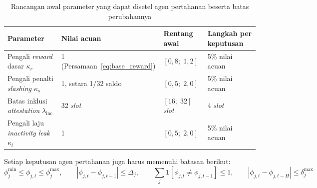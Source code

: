 \begin{table}[htbp]
\centering
\caption{Rancangan awal parameter yang dapat disetel agen pertahanan beserta batas perubahannya}
\label{tab:batas_parameter}
\small
\begin{tabular}{|p{3.8cm}|p{3.6cm}|p{2.6cm}|p{3.2cm}|}
\hline
\textbf{Parameter} & \textbf{Nilai acuan} & \textbf{Rentang awal} & \textbf{Langkah per keputusan} \\
\hline
Pengali \textit{reward} dasar $\kappa_r$ & 1 (Persamaan~\eqref{eq:base_reward}) & $[0{,}8;\; 1{,}2]$ & 5\% nilai acuan \\
\hline
Pengali penalti \textit{slashing} $\kappa_s$ & 1, setara 1/32 saldo \parencite{laneve2025stochastic} & $[0{,}5;\; 2{,}0]$ & 5\% nilai acuan \\
\hline
Batas inklusi \textit{attestation} $\lambda_{\text{inc}}$ & 32 \textit{slot} \parencite{laneve2025stochastic} & $[16;\; 32]$ \textit{slot} & 4 \textit{slot} \\
\hline
Pengali laju \textit{inactivity leak} $\kappa_l$ & 1 \parencite{laneve2025stochastic} & $[0{,}5;\; 2{,}0]$ & 5\% nilai acuan \\
\hline
\end{tabular}
\end{table}

Setiap keputusan agen pertahanan juga harus memenuhi batasan berikut:
\begin{equation}
\phi_j^{\min} \le \phi_{j,t} \le \phi_j^{\max}, \qquad
\left|\phi_{j,t} - \phi_{j,t-1}\right| \le \Delta_j, \qquad
\sum_{j} \mathbf{1}\!\left[\phi_{j,t} \neq \phi_{j,t-1}\right] \le 1, \qquad
\left|\phi_{j,t} - \phi_{j,t-H}\right| \le \delta_j^{\max}
\label{eq:batas_parameter}
\end{equation}

